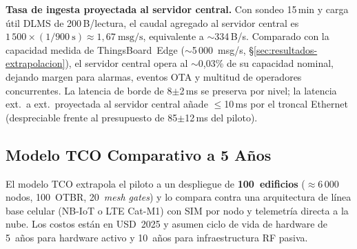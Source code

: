 \textbf{Tasa de ingesta proyectada al servidor central.} Con sondeo 15\,min y carga útil DLMS de 200\,B/lectura, el caudal agregado al servidor central es $1\,500 \times (1/900~\text{s}) \approx 1{,}67~\text{msg/s}$, equivalente a $\sim$334\,B/s. Comparado con la capacidad medida de ThingsBoard~Edge ($\sim$5\,000~msg/s, §\ref{sec:resultados-extrapolacion}), el servidor central opera al $\sim$0{,}03\% de su capacidad nominal, dejando margen para alarmas, eventos OTA y multitud de operadores concurrentes. La latencia de borde de 8$\pm$2\,ms se preserva por nivel; la latencia ext.\ a ext.\ proyectada al servidor central añade $\leq$10\,ms por el troncal Ethernet (despreciable frente al presupuesto de 85$\pm$12\,ms del piloto).

\subsection{Modelo TCO Comparativo a 5 Años}
\label{sec:viabilidad-tco}

El modelo TCO extrapola el piloto a un despliegue de \textbf{100~edificios} ($\approx$6\,000 nodos, 100~OTBR, 20~\emph{mesh gates}) y lo compara contra una arquitectura de línea base celular (NB-IoT o LTE Cat-M1) con SIM por nodo y telemetría directa a la nube. Los costos están en USD~2025 y asumen ciclo de vida de hardware de 5~años para hardware activo y 10~años para infraestructura RF pasiva.

\begin{table}[H]
\centering
\caption{TCO acumulado a 5 años: arquitectura propuesta vs línea base celular (USD, 100 edificios / 6\,000 nodos / 100 OTBR / 20 \emph{mesh gates})}
\label{tab:tco-5-anios}
\end{table}

